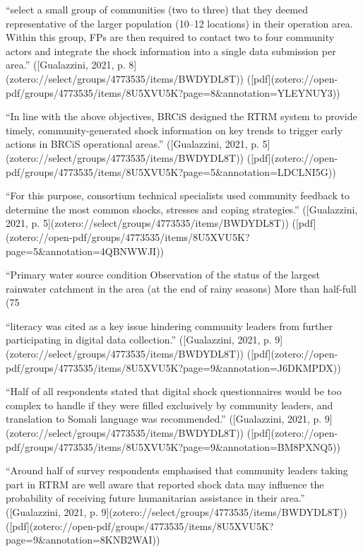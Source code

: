 {“select a small group of communities (two to three) that they deemed representative of the larger population (10–12 locations) in their operation area. Within this group, FPs are then required to contact two to four community actors and integrate the shock information into a single data submission per area.” ([Gualazzini, 2021, p. 8](zotero://select/groups/4773535/items/BWDYDL8T)) ([pdf](zotero://open-pdf/groups/4773535/items/8U5XVU5K?page=8&annotation=YLEYNUY3))

“In line with the above objectives, BRCiS designed the RTRM system to provide timely, community-generated shock information on key trends to trigger early actions in BRCiS operational areas.” ([Gualazzini, 2021, p. 5](zotero://select/groups/4773535/items/BWDYDL8T)) ([pdf](zotero://open-pdf/groups/4773535/items/8U5XVU5K?page=5&annotation=LDCLNI5G))

“For this purpose, consortium technical specialists used community feedback to determine the most common shocks, stresses and coping strategies.” ([Gualazzini, 2021, p. 5](zotero://select/groups/4773535/items/BWDYDL8T)) ([pdf](zotero://open-pdf/groups/4773535/items/8U5XVU5K?page=5&annotation=4QBNWWJI))

“Primary water source condition Observation of the status of the largest rainwater catchment in the area (at the end of rainy seasons) More than half-full (75%

“literacy was cited as a key issue hindering community leaders from further participating in digital data collection.” ([Gualazzini, 2021, p. 9](zotero://select/groups/4773535/items/BWDYDL8T)) ([pdf](zotero://open-pdf/groups/4773535/items/8U5XVU5K?page=9&annotation=J6DKMPDX))

“Half of all respondents stated that digital shock questionnaires would be too complex to handle if they were filled exclusively by community leaders, and translation to Somali language was recommended.” ([Gualazzini, 2021, p. 9](zotero://select/groups/4773535/items/BWDYDL8T)) ([pdf](zotero://open-pdf/groups/4773535/items/8U5XVU5K?page=9&annotation=BM8PXNQ5))

“Around half of survey respondents emphasised that community leaders taking part in RTRM are well aware that reported shock data may influence the probability of receiving future humanitarian assistance in their area.” ([Gualazzini, 2021, p. 9](zotero://select/groups/4773535/items/BWDYDL8T)) ([pdf](zotero://open-pdf/groups/4773535/items/8U5XVU5K?page=9&annotation=8KNB2WAI))

}
